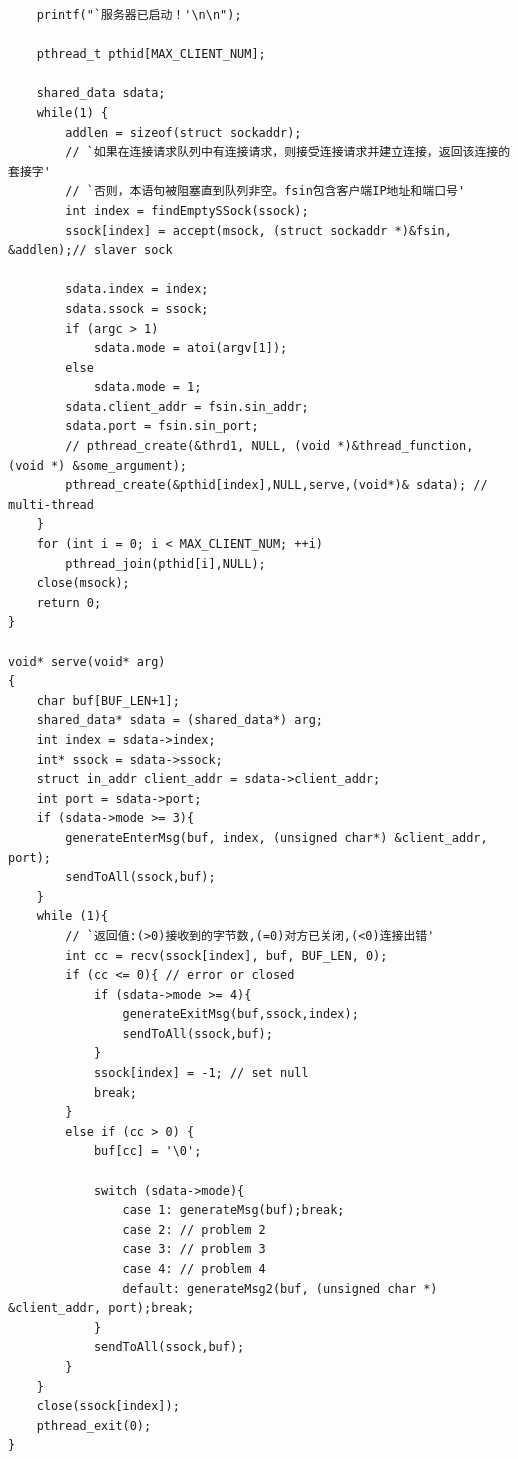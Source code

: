 \documentclass[logo,reportComp]{thesis}
\begin{document}
\begin{lstlisting}
    printf("`服务器已启动！'\n\n");

    pthread_t pthid[MAX_CLIENT_NUM];

    shared_data sdata;
    while(1) {
        addlen = sizeof(struct sockaddr);
        // `如果在连接请求队列中有连接请求，则接受连接请求并建立连接，返回该连接的套接字'
        // `否则，本语句被阻塞直到队列非空。fsin包含客户端IP地址和端口号'
        int index = findEmptySSock(ssock);
        ssock[index] = accept(msock, (struct sockaddr *)&fsin, &addlen);// slaver sock

        sdata.index = index;
        sdata.ssock = ssock;
        if (argc > 1)
            sdata.mode = atoi(argv[1]);
        else
            sdata.mode = 1;
        sdata.client_addr = fsin.sin_addr;
        sdata.port = fsin.sin_port;
        // pthread_create(&thrd1, NULL, (void *)&thread_function, (void *) &some_argument);
        pthread_create(&pthid[index],NULL,serve,(void*)& sdata); // multi-thread
    }
    for (int i = 0; i < MAX_CLIENT_NUM; ++i)
        pthread_join(pthid[i],NULL);
    close(msock);
    return 0;
}

void* serve(void* arg)
{
    char buf[BUF_LEN+1];
    shared_data* sdata = (shared_data*) arg;
    int index = sdata->index;
    int* ssock = sdata->ssock;
    struct in_addr client_addr = sdata->client_addr;
    int port = sdata->port;
    if (sdata->mode >= 3){
        generateEnterMsg(buf, index, (unsigned char*) &client_addr, port);
        sendToAll(ssock,buf);
    }
    while (1){
        // `返回值:(>0)接收到的字节数,(=0)对方已关闭,(<0)连接出错'
        int cc = recv(ssock[index], buf, BUF_LEN, 0);
        if (cc <= 0){ // error or closed
            if (sdata->mode >= 4){
                generateExitMsg(buf,ssock,index);
                sendToAll(ssock,buf);
            }
            ssock[index] = -1; // set null
            break;
        }
        else if (cc > 0) {
            buf[cc] = '\0';

            switch (sdata->mode){
                case 1: generateMsg(buf);break;
                case 2: // problem 2
                case 3: // problem 3
                case 4: // problem 4
                default: generateMsg2(buf, (unsigned char *) &client_addr, port);break;
            }
            sendToAll(ssock,buf);
        }
    }
    close(ssock[index]);
    pthread_exit(0);
}
\end{lstlisting}
\end{document}
